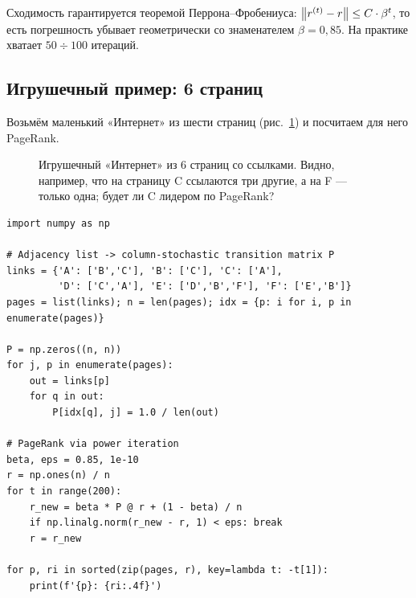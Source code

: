 Сходимость гарантируется теоремой Перрона--Фробениуса:
$\left\|r^{(t)}-r\right\|\leq C\cdot\beta^{t}$, то есть погрешность убывает
геометрически со знаменателем $\beta=0{,}85$. На практике хватает
$50\div 100$ итераций.

\subsection{Игрушечный пример: 6 страниц}

Возьмём маленький «Интернет» из шести страниц (рис.~\ref{fig:pagerank-graph})
и посчитаем для него PageRank.

\begin{figure}[ht]
\centering
{}
\caption{Игрушечный «Интернет» из 6 страниц со ссылками. Видно,
например, что на страницу C ссылаются три другие, а на F — только
одна; будет ли C лидером по PageRank?}
\label{fig:pagerank-graph}
\end{figure}

\begin{lstlisting}[label={lst:pagerank}]
import numpy as np

# Adjacency list -> column-stochastic transition matrix P
links = {'A': ['B','C'], 'B': ['C'], 'C': ['A'],
         'D': ['C','A'], 'E': ['D','B','F'], 'F': ['E','B']}
pages = list(links); n = len(pages); idx = {p: i for i, p in enumerate(pages)}

P = np.zeros((n, n))
for j, p in enumerate(pages):
    out = links[p]
    for q in out:
        P[idx[q], j] = 1.0 / len(out)

# PageRank via power iteration
beta, eps = 0.85, 1e-10
r = np.ones(n) / n
for t in range(200):
    r_new = beta * P @ r + (1 - beta) / n
    if np.linalg.norm(r_new - r, 1) < eps: break
    r = r_new

for p, ri in sorted(zip(pages, r), key=lambda t: -t[1]):
    print(f'{p}: {ri:.4f}')
\end{lstlisting}


